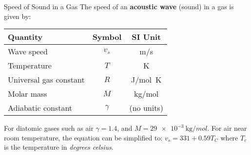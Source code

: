 \documentclass[12pt,aspectratio=169]{beamer}
\newcommand{\eq}[2]{\vspace{#1}{\Large\begin{displaymath}#2\end{displaymath}}}
\begin{document}
\begin{frame}{Speed of Sound in a Gas}
  The speed of an \textbf{acoustic wave} (sound) in a gas is given by:
  
  \eq{-.2in}{
    \boxed{v_s=\sqrt{\frac{\gamma RT}{M}}}
  }
  \begin{center}
    \begin{tabular}{l|c|c}
      \rowcolor{pink}
      \textbf{Quantity} & \textbf{Symbol} & \textbf{SI Unit} \\ \hline
      Wave speed             & $v_s$    & \si{m/s}\\
      Temperature            & $T$      & \si{\kelvin}\\
      Universal gas constant & $R$      & \si{J/mol.K}\\
      Molar mass             & $M$      & \si{\kilo\gram/mol}\\
      Adiabatic constant     & $\gamma$ & (no units)
    \end{tabular}
  \end{center}
  For diatomic gases such as air $\gamma=1.4$, and
  $M=\SI{29e-3}{\kilo\gram/mol}$. For air near room temperature, the equation
  can be simplified to: $\boxed{v_s=331+0.59T_C}$ where $T_c$ is the
  temperature in \emph{degrees celsius}.
\end{frame}
\end{document}
